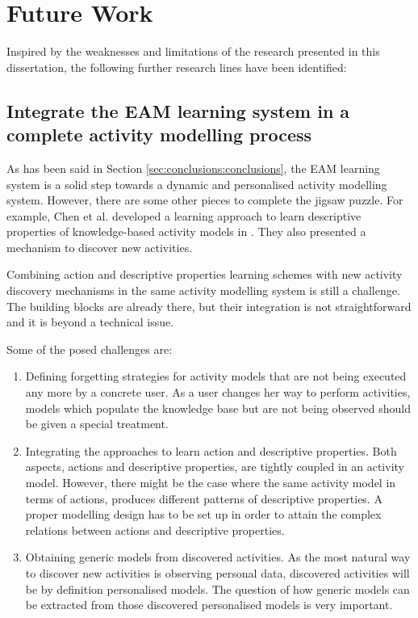 \section{Future Work}
\label{sec:conclusions:future}

Inspired by the weaknesses and limitations of the research presented in this dissertation, the following further research lines have been identified:

\subsection{Integrate the EAM learning system in a complete activity modelling process}

As has been said in Section \ref{sec:conclusions:conclusions}, the EAM learning system is a solid step towards a dynamic and personalised activity modelling system. However, there are some other pieces to complete the jigsaw puzzle. For example, Chen et al. developed a learning approach to learn descriptive properties of knowledge-based activity models in \cite{Chen2014}. They also presented a mechanism to discover new activities.

Combining action and descriptive properties learning schemes with new activity discovery mechanisms in the same activity modelling system is still a challenge. The building blocks are already there, but their integration is not straightforward and it is beyond a technical issue. 

Some of the posed challenges are:

\begin{enumerate}
 \item Defining forgetting strategies for activity models that are not being executed any more by a concrete user. As a user changes her way to perform activities, models which populate the knowledge base but are not being observed should be given a special treatment.
 \item Integrating the approaches to learn action and descriptive properties. Both aspects, actions and descriptive properties, are tightly coupled in an activity model. However, there might be the case where the same activity model in terms of actions, produces different patterns of descriptive properties. A proper modelling design has to be set up in order to attain the complex relations between actions and descriptive properties.
 \item Obtaining generic models from discovered activities. As the most natural way to discover new activities is observing personal data, discovered activities will be by definition personalised models. The question of how generic models can be extracted from those discovered personalised models is very important.
\end{enumerate}


